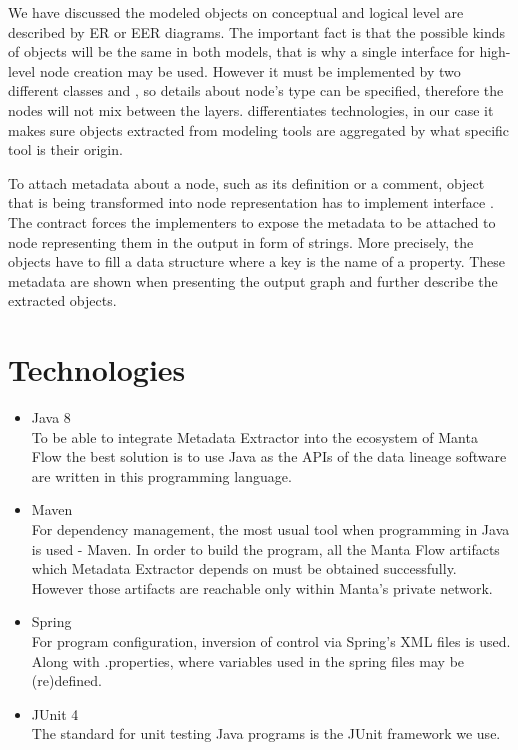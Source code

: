 We have discussed the modeled objects on conceptual and logical level are described by ER or EER diagrams. 
The important fact is that the possible kinds of objects will be the same in both models, that is why a single interface  for high-level node creation may be used.
However it must be implemented by two different classes  and , so details about node's type can be specified, therefore the nodes will not mix between the layers.
 differentiates technologies, in our case it makes sure objects extracted from modeling tools are aggregated by what specific tool is their origin.

To attach metadata about a node, such as its definition or a comment, object that is being transformed into node representation has to implement interface .
The contract forces the implementers to expose the metadata to be attached to node representing them in the output in form of strings. 
More precisely, the objects have to fill a  data structure where a key is the name of a property. 
These metadata are shown when presenting the output graph and further describe the extracted objects.

\section{Technologies}

\begin{itemize}
	\item Java 8 \\
	To be able to integrate Metadata Extractor into the ecosystem of Manta Flow the best solution is to use Java as the APIs of the data lineage software are written in this programming language.
	\item Maven \\ 
	For dependency management, the most usual tool when programming in Java is used - Maven. In order to build the program, all the Manta Flow artifacts which Metadata Extractor depends on must be obtained successfully. However those artifacts are reachable only within Manta's private network.
	\item Spring \\
	For program configuration, inversion of control via Spring's XML files is used. Along with .properties, where variables used in the spring files may be (re)defined.
	\item JUnit 4 \\ 
	The standard for unit testing Java programs is the JUnit framework we use.
\end{itemize}

